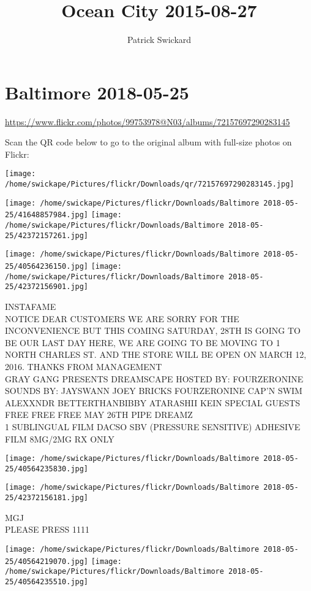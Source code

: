 \documentclass[10pt,letterpaper]{article}
\title{Ocean City 2015-08-27}
\author{Patrick Swickard}
\date{}
\begin{document}
\section*{Baltimore 2018-05-25}

\url{https://www.flickr.com/photos/99753978@N03/albums/72157697290283145}

Scan the QR code below to go to the original album with full-size photos on Flickr:

\texttt{[image: /home/swickape/Pictures/flickr/Downloads/qr/72157697290283145.jpg]}
\pagebreak

\texttt{[image: /home/swickape/Pictures/flickr/Downloads/Baltimore 2018-05-25/41648857984.jpg]}
\texttt{[image: /home/swickape/Pictures/flickr/Downloads/Baltimore 2018-05-25/42372157261.jpg]}

\texttt{[image: /home/swickape/Pictures/flickr/Downloads/Baltimore 2018-05-25/40564236150.jpg]}
\texttt{[image: /home/swickape/Pictures/flickr/Downloads/Baltimore 2018-05-25/42372156901.jpg]}

INSTAFAME\\
NOTICE DEAR CUSTOMERS WE ARE SORRY FOR THE INCONVENIENCE BUT THIS COMING SATURDAY, 28TH IS GOING TO BE OUR LAST DAY HERE, WE ARE GOING TO BE MOVING TO 1 NORTH CHARLES ST. AND THE STORE WILL BE OPEN ON MARCH 12, 2016.  THANKS FROM MANAGEMENT\\
GRAY GANG PRESENTS DREAMSCAPE HOSTED BY: FOURZERONINE SOUNDS BY: JAYSWANN JOEY BRICKS FOURZERONINE CAP'N SWIM ALEXXNDR BETTERTHANBIBBY ATARASHII KEIN SPECIAL GUESTS FREE FREE FREE MAY 26TH PIPE DREAMZ\\
1 SUBLINGUAL FILM DACSO SBV (PRESSURE SENSITIVE) ADHESIVE FILM 8MG/2MG RX ONLY
\pagebreak

\texttt{[image: /home/swickape/Pictures/flickr/Downloads/Baltimore 2018-05-25/40564235830.jpg]}

\vspace{0.25in}
\texttt{[image: /home/swickape/Pictures/flickr/Downloads/Baltimore 2018-05-25/42372156181.jpg]}

MGJ\\
PLEASE PRESS 1111
\pagebreak

\texttt{[image: /home/swickape/Pictures/flickr/Downloads/Baltimore 2018-05-25/40564219070.jpg]}
\texttt{[image: /home/swickape/Pictures/flickr/Downloads/Baltimore 2018-05-25/40564235510.jpg]}
\end{document}
